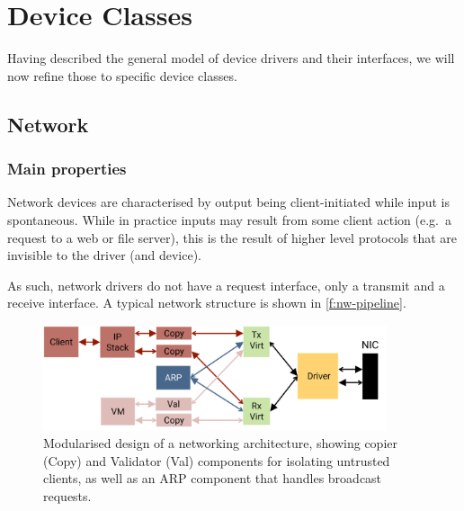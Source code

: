 \documentclass[a4paper,12pt]{report}
\begin{document}
\chapter{Device Classes}\label{s:classes}

Having described the general model of device drivers and their
interfaces, we will now refine those to specific device classes.


\section{Network}\label{s:cl-nw}

\subsection{Main properties}

Network devices are characterised by output being client-initiated
while input is spontaneous. While in practice inputs may result
from some client action (e.g.\ a request to a web or file server), this
is the result of higher level protocols that are invisible to the
driver (and device).

As such, network drivers do not have a request interface, only a
transmit and a receive interface. A typical network structure is shown
in \autoref{f:nw-pipeline}.

\begin{figure}[ht]
  \centering
  \includegraphics[width=0.9\textwidth]{pipeline-nw}
  \caption[Modularised design of a networking
  architecture.]{Modularised design of a networking architecture,
    showing
    copier (Copy) and Validator (Val) components for isolating
    untrusted clients, as well as an ARP component that handles
    broadcast requests.}
  \label{f:nw-pipeline}
\end{figure}
\end{document}
